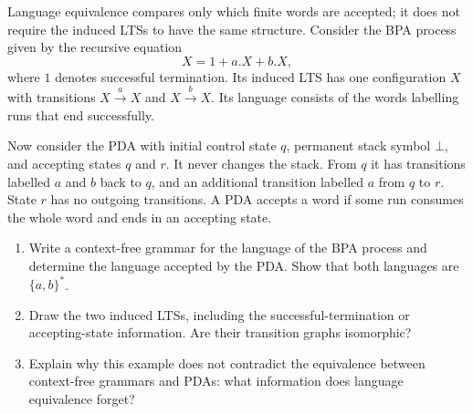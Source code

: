 \documentclass{tutorial}
\begin{document}
\begin{exercise}
Language equivalence compares only which finite words are accepted; it
does not require the induced LTSs to have the same structure. Consider
the BPA process given by the recursive equation
\[
  X = 1 + a.X + b.X,
\]
where $1$ denotes successful termination. Its induced LTS has one
configuration $X$ with transitions $X\xrightarrow{a}X$ and
$X\xrightarrow{b}X$. Its language consists of the words labelling runs
that end successfully.

Now consider the PDA with initial control state $q$, permanent stack
symbol $\bot$, and accepting states $q$ and $r$. It never changes the
stack. From $q$ it has transitions labelled $a$ and $b$ back to $q$, and
an additional transition labelled $a$ from $q$ to $r$. State $r$ has no
outgoing transitions. A PDA accepts a word if some run consumes the whole
word and ends in an accepting state.
\begin{enumerate}
  \item Write a context-free grammar for the language of the BPA process
        and determine the language accepted by the PDA. Show that both
        languages are $\{a,b\}^*$.
  \item Draw the two induced LTSs, including the successful-termination
        or accepting-state information. Are their transition graphs
        isomorphic?
  \item Explain why this example does not contradict the equivalence
        between context-free grammars and PDAs: what information does
        language equivalence forget?
\end{enumerate}
\end{exercise}
\end{document}
